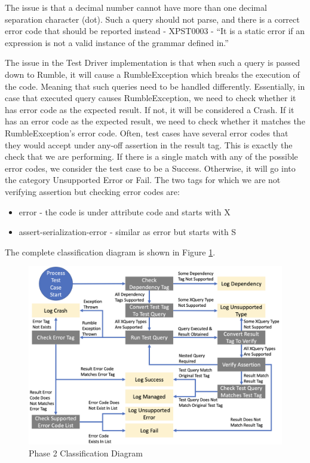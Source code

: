 

The issue is that a decimal number cannot have more than one decimal separation character (dot). Such a query should not parse, and there is a correct error code that should be reported instead - XPST0003 - ``It is a static error if an expression is not a valid instance of the grammar defined in.'' 

The issue in the Test Driver implementation is that when such a query is passed down to Rumble, it will cause a RumbleException which breaks the execution of the code. Meaning that such queries need to be handled differently. Essentially, in case that executed query causes RumbleException, we need to check whether it has error code as the expected result. If not, it will be considered a Crash. If it has an error code as the expected result, we need to check whether it matches the RumbleException's error code. Often, test cases have several error codes that they would accept under any-off assertion in the result tag. This is exactly the check that we are performing. If there is a single match with any of the possible error codes, we consider the test case to be a Success. Otherwise, it will go into the category Unsupported Error or Fail. The two tags for which we are not verifying assertion but checking error codes are:
\begin{itemize}
	\item error - the code is under attribute code and starts with X
	\item assert-serialization-error - similar as error but starts with S
\end{itemize}
The complete classification diagram is shown in Figure \ref{fig:Phase2_ErrorCodes}.

\begin{figure}[h!]
	\includegraphics[width=\linewidth]{error_code.png}
	\caption{Phase 2 Classification Diagram}
	\label{fig:Phase2_ErrorCodes}
\end{figure}

